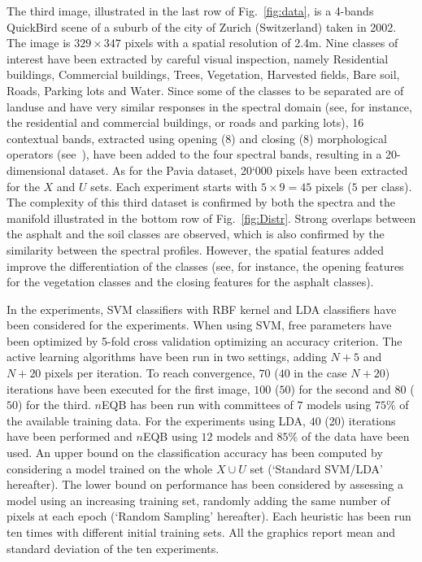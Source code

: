 The third image, illustrated in the last row of Fig.~\ref{fig:data}, is a 4-bands QuickBird scene of a suburb of the city of Zurich (Switzerland) taken in 2002. The image is $329 \times 347$ pixels with a spatial resolution of 2.4m. Nine classes of interest have been extracted by careful visual inspection, namely Residential buildings, Commercial buildings, Trees, Vegetation, Harvested fields, Bare soil, Roads, Parking lots and Water. Since some of the classes to be separated are of landuse and have very similar responses in the spectral domain (see, for instance, the residential and commercial buildings, or roads and parking lots), 16 contextual bands, extracted using opening (8) and closing (8) morphological operators (see~), have been added to the four spectral bands, resulting in a 20-dimensional dataset. As for the Pavia dataset, 20`000 pixels have been extracted for the $X$ and $U$ sets. Each experiment starts with $5 \times 9 =45$ pixels ($5$ per class). 
The complexity of this third dataset is confirmed by both the spectra and the manifold illustrated in the bottom row of Fig.~\ref{fig:Distr}. Strong overlaps between the asphalt and the soil classes are observed, which is also confirmed by the similarity between the spectral profiles. However, the spatial features added improve the differentiation of the classes (see, for instance, the opening features for the vegetation classes and the closing features for the asphalt classes).

In the experiments, SVM classifiers with RBF kernel and LDA classifiers have been considered for the experiments.  When using SVM, free parameters have been optimized by 5-fold cross validation optimizing an accuracy criterion. The active learning algorithms have been run in two settings, adding $N+5$ and $N+20$ pixels per iteration. To reach convergence, $70$ ($40$ in the case $N + 20$) iterations have been executed for the first image, $100$ ($50$) for the second and $80$ ($50$) for the third. $n$EQB has been run with committees of $7$ models using $75\%$ of the available training data. For the experiments using LDA, $40$ (20) iterations have been performed and $n$EQB using $12$ models and $85\%$ of the data have been used. 
An upper bound on the classification accuracy has been computed by considering a model trained on the whole $X \cup U$ set (`Standard SVM/LDA' hereafter). The lower bound on performance has been considered by assessing a model using an increasing training set, randomly adding the same number of pixels at each epoch (`Random Sampling' hereafter). 
Each heuristic has been run ten times with different initial training sets. All the graphics report mean and standard deviation of the ten experiments.

